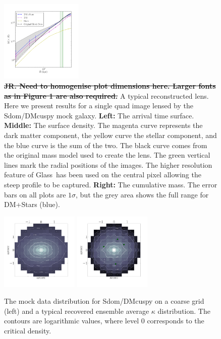 \documentclass[galley,usenatbib]{mn2e}
\newcommand{\Glass}{{\sc Glass}}
\begin{document}
\begin{figure}
  \includegraphics[width=0.35\textwidth]{ACQuadR1a_TmS-c.pdf}
\caption{
  \sout{{\bf JR. Need to homogenise plot dimensions here. Larger fonts as in Figure 1 are also required.} }
A typical reconstructed lens. Here we present results for a single quad image lensed by the Sdom/DMcuspy mock galaxy.
\textbf{Left:}
The arrival time surface. 
\textbf{Middle:}
The surface density. The magenta curve represents the dark matter component,
the yellow curve the stellar component, and the blue curve is the sum of the two.
The black curve comes from the original mass model used to create the lens.
The green vertical lines mark the radial positions of the images. The higher
resolution feature of \Glass\ has been used on the central pixel allowing the
steep profile to be captured.
\textbf{Right:}
The cumulative mass. The error bars on all plots are $1\sigma$, but the grey area shows the full range for DM+Stars (blue).}
\label{reconstruction}
\end{figure}

\begin{figure}
\includegraphics[width=0.33\textwidth]{BCQuadR1a_TmS-kappa-a.pdf}
\includegraphics[width=0.33\textwidth]{BCQuadR1a_TmS-kappa-b.pdf}
\caption{ The mock data distribution for Sdom/DMcuspy on a coarse grid (left)
  and a typical recovered ensemble average $\kappa$ distribution. The contours are
  logarithmic values, where level 0 corresponds to the critical density.}
\label{2d mass reconstruction}
\end{figure}
\end{document}
